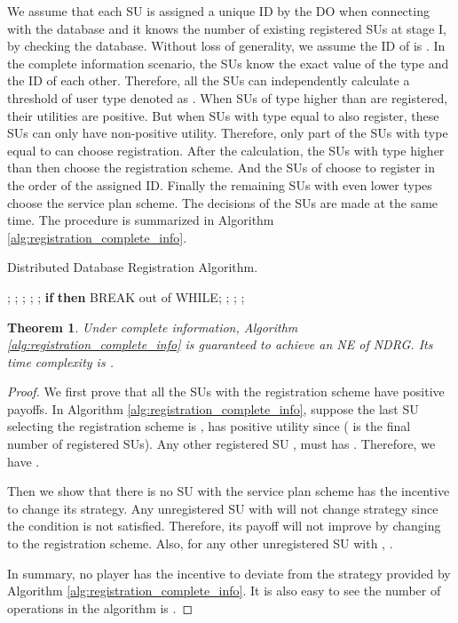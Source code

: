 \documentclass[journal]{IEEEtran}
\newtheorem{theorem}{Theorem}
\begin{document}
We assume that each SU is assigned a unique ID by the DO when connecting with the database and it knows the number of existing registered SUs at stage I, by checking the database. Without loss of generality, we assume the ID of  is . In the complete information scenario, the SUs know the exact value of the type and the ID of each other. Therefore, all the SUs can independently calculate a threshold of user type denoted as . When SUs of type higher than  are registered, their utilities are positive. But when SUs with type equal to  also register, these SUs can only have non-positive utility. Therefore, only part of the SUs with type equal to  can choose registration. After the calculation, the SUs with type higher than  then choose the registration scheme. And the SUs of  choose to register in the order of the assigned ID. Finally the remaining SUs with even lower types choose the service plan scheme. The decisions of the SUs are made at the same time.
The procedure is summarized in Algorithm \ref{alg:registration_complete_info}.

\begin{algorithm}[tp]
\caption {Distributed Database Registration Algorithm.}
\label{alg:registration_complete_info}
\begin{algorithmic}[1]
\STATE ; ; ;
\WHILE {}
\STATE ; ;
\STATE \textbf{if} {} \textbf{then} BREAK out of WHILE;
\ENDWHILE
\STATE ;
\FOR {}
\IF {{} \AND {}}
\STATE ; ;
\ENDIF
\ENDFOR
\end{algorithmic}
\end{algorithm}

\begin{theorem}
\label{thm:algorithm1_property}
Under complete information, Algorithm \ref{alg:registration_complete_info} is guaranteed to achieve an NE of NDRG. Its time complexity is .
\end{theorem}
\begin{proof}
We first prove that all the SUs with the registration scheme have positive payoffs. In Algorithm \ref{alg:registration_complete_info}, suppose the last SU selecting the registration scheme is ,  has positive utility since  ( is the final number of registered SUs). Any other registered SU , must has . Therefore, we have .

Then we show that there is no SU with the service plan scheme has the incentive to change its strategy. Any unregistered SU  with  will not change strategy since the condition  is not satisfied. Therefore, its payoff will not improve by changing to the registration scheme. Also, for any other unregistered SU  with , .

In summary, no player has the incentive to deviate from the strategy provided by Algorithm \ref{alg:registration_complete_info}. It is also easy to see the number of operations in the algorithm is .
\end{proof}
\end{document}
